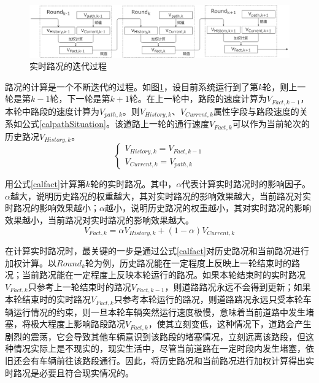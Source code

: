 \begin{figure}[ht]
  \centering
  \includegraphics[width=1\textwidth]{undergraduate-thesis/images/calFactPathSituation.png}
  \caption{实时路况的迭代过程}
  \label{calFactPathSituation_pic} %
\end{figure}

路况的计算是一个不断迭代的过程。如图\ref{calFactPathSituation_pic}，设目前系统运行到了第$k$轮，则上一轮是第$k-1$轮，下一轮是第$k+1$轮。在上一轮中，路段的速度计算为$V_{Fact,k-1}$，本轮中路段的速度计算为$V_{path,k}$。则$V_{History,k}$、$V_{Current,k}$属性字段与路段速度的关系如公式\ref{calpathSituation}。该道路上一轮的通行速度$V_{Fact,k}$可以作为当前轮次的历史路况$V_{History,k}$。
\begin{equation}
    \left\{
    \begin{matrix}
    V_{History,k}=V_{Fact,{k-1}}
    \\
    V_{Current,k}=V_{path,k}
    \end{matrix}
    \right.
\label{calpathSituation}
\end{equation}

用公式\ref{calfact}计算第$k$轮的实时路况。其中，$\alpha$代表计算实时路况时的影响因子。$\alpha$越大，说明历史路况的权重越大，其对实时路况的影响效果越大，当前路况对实时路况的影响效果越小；$\alpha$越小，说明历史路况的权重越小，其对实时路况的影响效果越小，当前路况对实时路况的影响效果越大。
\begin{equation}
    V_{Fact,k}=\alpha V_{History,k}+(1-\alpha) V_{Current,k}
\label{calfact}
\end{equation}

在计算实时路况时，最关键的一步是通过公式\ref{calfact}对历史路况和当前路况进行加权计算。以$Round_k$轮为例，历史路况能在一定程度上反映上一轮结束时的路况；当前路况能在一定程度上反映本轮运行的路况。如果本轮结束时的实时路况$V_{Fact,k}$只参考上一轮结束时的路况$V_{Fact,k-1}$，则道路路况永远不会得到更新；如果本轮结束时的实时路况$V_{Fact,k}$只参考本轮运行的路况，则道路路况永远只受本轮车辆运行情况的约束，则一旦本轮车辆突然运行速度极慢，意味着当前道路中发生堵塞，将极大程度上影响路段路况$V_{Fact,k}$，使其立刻变低，这种情况下，道路会产生剧烈的震荡，它会导致其他车辆意识到该路段的堵塞情况，立刻远离该路段，但这种情况实际上是不现实的，现实生活中，尽管当前道路在一定时段内发生堵塞，依旧还会有车辆前往该路段通行。因此，将历史路况和当前路况进行加权计算得出实时路况是必要且符合现实情况的。

